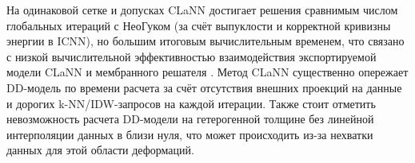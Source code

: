   На одинаковой сетке и допусках CLaNN достигает решения сравнимым числом глобальных итераций с Нео\textendash Гуком
  (за счёт выпуклости и корректной кривизны энергии в ICNN), но большим итоговым вычислительным временем, что связано с низкой вычислительной эффективностью 
  взаимодействия экспортируемой модели CLaNN и мембранного решателя \cite{xi2023}.
  Метод CLaNN существенно опережает DD-модель по времени расчета
  за счёт отсутствия внешних проекций на данные и дорогих k-NN/IDW-запросов на каждой итерации.
  Также стоит отметить невозможность расчета DD-модели на гетерогенной толщине без линейной интерполяции данных в близи нуля, 
  что может происходить из-за нехватки данных для этой области деформаций.


